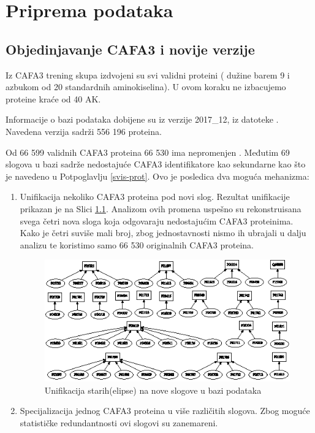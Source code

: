 
\chapter{Priprema podataka} %

\label{Priprema_podataka} %

\section{Objedinjavanje CAFA3 i novije \swissprot verzije}

Iz CAFA3 trening skupa izdvojeni su svi validni proteini ( dužine barem 9 i
azbukom od 20 standardnih aminokiselina). U ovom koraku ne izbacujemo proteine
kraće od 40 AK.

Informacije o \swissprot bazi podataka dobijene su iz verzije 2017\_12, iz datoteke
 \cite{sprot}.
Navedena verzija sadrži 556 196 proteina. 

Od 66 599 validnih CAFA3 proteina 66 530 ima nepromenjen . Međutim  69 slogova u \swissprot bazi sadrže nedostajuće CAFA3
identifikatore kao sekundarne kao što je navedeno u Potpoglavlju
\ref{svis-prot}. Ovo je posledica dva moguća mehanizma:

\begin{enumerate}
  \item Unifikacija nekoliko CAFA3 proteina pod novi slog.
    Rezultat unifikacije prikazan je na Slici \ref{fig:unifikacija_slogova}. Analizom
    ovih promena uspešno su rekonstruisana svega četri nova \swissprot sloga
    koja odgovaraju nedostajućim CAFA3 proteinima. Kako je četri
    suviše mali broj, zbog jednostavnosti nismo ih ubrajali u dalju analizu
    te koristimo samo 66 530 originalnih CAFA3 proteina.

  \begin{figure}[th]
  \centering
  \includegraphics[scale=2]{plots/unifikacija_slogova2.eps}
  \decoRule
  \caption{Unifikacija starih(elipse) na nove slogove u \swissprot bazi podataka}
  \label{fig:unifikacija_slogova}
  \end{figure}

  \item Specijalizacija jednog CAFA3 proteina u više različitih slogova.  Zbog moguće
    statističke redundantnosti ovi slogovi su zanemareni.
\end{enumerate}


